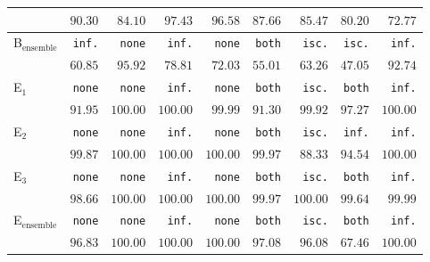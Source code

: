 \documentclass[runningheads]{llncs}
\begin{document}
\begin{table}[ht!]
\begin{center}
\begin{tabularx}{\textwidth}{|X|r|r|r|r|r|r|r|r|}
			 & \cellcolor{red!25}$90.30$ & $84.10$ & $97.43$ & \cellcolor{red!25}$96.58$ & \cellcolor{red!25}$87.66$ & $85.47$ & \cellcolor{red!25}$80.20$ & \cellcolor{red!25}$72.77$ \\ 
			\hline
			B$_\text{ensemble}$ & \cellcolor{red!25}\texttt{inf.} & \texttt{none} & \texttt{inf.} & \cellcolor{red!25}\texttt{none} & \cellcolor{red!25}\texttt{both} & \texttt{isc.} & \cellcolor{red!25}\texttt{isc.} & \cellcolor{red!25}\texttt{inf.}\\
			 & \cellcolor{red!25}$60.85$ & $95.92$ & $78.81$ & \cellcolor{red!25}$72.03$ & \cellcolor{red!25}$55.01$ & $63.26$ & \cellcolor{red!25}$47.05$ & \cellcolor{red!25}$92.74$ \\ 
			 \hline\hline
			E$_1$& \texttt{none} & \texttt{none} & \texttt{inf.} & \cellcolor{red!25}\texttt{none} & \cellcolor{red!25}\texttt{both} & \texttt{isc.} & \texttt{both} & \cellcolor{red!25}\texttt{inf.} \\
			 & $91.95$ & $100.00$ & $100.00$ & \cellcolor{red!25}$99.99$ & \cellcolor{red!25}$91.30$ & $99.92$ & $97.27$ & \cellcolor{red!25}$100.00$ \\ 
			E$_2$ & \texttt{none} & \texttt{none} & \texttt{inf.} & \cellcolor{red!25}\texttt{none} & \cellcolor{red!25}\texttt{both} & \texttt{isc.} & \cellcolor{red!25}\texttt{inf.} & \cellcolor{red!25}\texttt{inf.} \\
			 & $99.87$ & $100.00$ & $100.00$ & \cellcolor{red!25}$100.00$ & \cellcolor{red!25}$99.97$ & $88.33$ & \cellcolor{red!25}$94.54$ & \cellcolor{red!25}$100.00$ \\ 
			E$_3$ & \texttt{none} & \texttt{none} & \texttt{inf.} & \cellcolor{red!25}\texttt{none} & \cellcolor{red!25}\texttt{both} & \texttt{isc.} & \texttt{both} & \cellcolor{red!25}\texttt{inf.} \\
			 & $98.66$ & $100.00$ & $100.00$ & \cellcolor{red!25}$100.00$ & \cellcolor{red!25}$99.97$ & $100.00$ & $99.64$ & \cellcolor{red!25}$99.99$ \\ 
			\hline
			E$_\text{ensemble}$ & \texttt{none} & \texttt{none} & \texttt{inf.} & \cellcolor{red!25}\texttt{none} & \cellcolor{red!25}\texttt{both} & \texttt{isc.} & \texttt{both} & \cellcolor{red!25}\texttt{inf.} \\
			 & $96.83$ & $100.00$ & $100.00$ & \cellcolor{red!25}$100.00$ & \cellcolor{red!25}$97.08$ & $96.08$ & $67.46$ & \cellcolor{red!25}$100.00$ \\
			\hline
		\end{tabularx}		
	\end{center}
\end{table}
\end{document}
